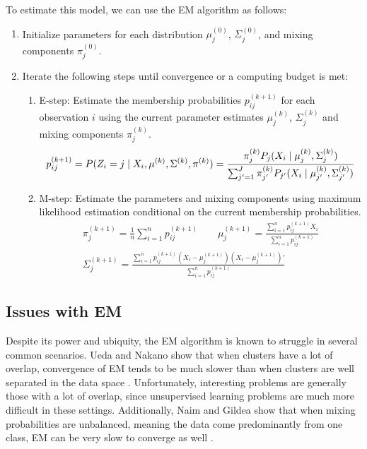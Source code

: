 \documentclass{article}
\newcommand*{\cond}{\;\ifnum\currentgrouptype=16 \middle\fi|\;}
\theoremstyle{definition}
\theoremstyle{algodesc}
\begin{document}
To estimate this model, we can use the EM algorithm as follows:
\begin{enumerate}
\item Initialize parameters for each distribution $\mu_j^{(0)}$, $\Sigma_j^{(0)}$, and mixing components $\pi_j^{(0)}$.
\item Iterate the following steps until convergence or a computing budget is met:
  \begin{enumerate}
  \item E-step: Estimate the membership probabilities $p_{ij}^{(k+1)}$ for each observation $i$ using the current parameter estimates $\mu_j^{(k)}$, $\Sigma_j^{(k)}$ and mixing components $\pi_j^{(k)}$.
    \begin{equation} \label{eq:em_estep}
    p_{ij}^{(k+1)} = P(Z_i = j \cond X_i, \mu^{(k)}, \Sigma^{(k)}, \pi^{(k)})
      = \frac{\pi_j^{(k)} P_j(X_i \cond \mu_j^{(k)}, \Sigma_j^{(k)})}{\sum_{j'=1}^J \pi_{j'}^{(k)} P_{j'}(X_i \cond \mu_{j'}^{(k)}, \Sigma_{j'}^{(k)})}
    \end{equation}
  \item M-step: Estimate the parameters and mixing components using maximum likelihood estimation conditional on the current membership probabilities.
    \begin{equation} \label{eq:em_mstep}
    \begin{gathered}
    \pi_j^{(k+1)} = \frac{1}{n} \sum_{i=1}^n p_{ij}^{(k+1)} \qquad
    \mu_j^{(k+1)} = \frac{\sum_{i=1}^n p_{ij}^{(k+1)} X_i}{\sum_{i=1}^n p_{ij}^{(k+1)}} \\
    \Sigma_j^{(k+1)} = \frac{\sum_{i=1}^n p_{ij}^{(k+1)} (X_i - \mu_j^{(k+1)}) (X_i - \mu_j^{(k+1)})'}{\sum_{i=1}^n p_{ij}^{(k+1)}}
    \end{gathered}
    \end{equation}
  \end{enumerate}
\end{enumerate}


\subsection{Issues with EM}

Despite its power and ubiquity, the EM algorithm is known to struggle in several common scenarios. Ueda and Nakano show that when clusters have a lot of overlap, convergence of EM tends to be much slower than when clusters are well separated in the data space \cite{uedanakano98}. Unfortunately, interesting problems are generally those with a lot of overlap, since unsupervised learning problems are much more difficult in these settings. Additionally, Naim and Gildea show that when mixing probabilities are unbalanced, meaning the data come predominantly from one class, EM can be very slow to converge as well \cite{naimgildea12}.
\end{document}
